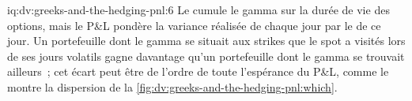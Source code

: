 \begin{solution}{iq:dv:greeks-and-the-hedging-pnl:6}
Le  cumule le gamma sur la durée de vie des options, mais le P\&L pondère la variance réalisée
de chaque jour par le  de ce jour. Un portefeuille dont le gamma se situait aux strikes
que le spot a visités lors de ses jours volatils gagne davantage qu'un portefeuille dont le gamma
se trouvait ailleurs~; cet écart peut être de l'ordre de toute l'espérance du P\&L, comme le montre
la dispersion de la \cref{fig:dv:greeks-and-the-hedging-pnl:which}.
\end{solution}
